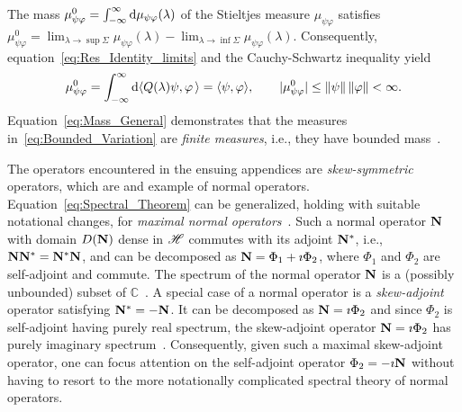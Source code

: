 \documentclass[amsa]{ipart}
\begin{document}
The mass $\mu^0_{\psi\varphi}=\int_{-\infty}^\infty\mathrm{d}\mu_{\psi\varphi}(\lambda)$ of the
Stieltjes measure $\mu_{\psi\varphi}$ satisfies~\cite{Stone:64}
$\mu^0_{\psi\varphi}=\lim_{\lambda\to\sup\Sigma}\mu_{\psi\varphi}(\lambda)-\lim_{\lambda\to\inf\Sigma}\mu_{\psi\varphi}(\lambda)$. Consequently,
equation~\eqref{eq:Res_Identity_limits} and the Cauchy-Schwartz
inequality yield
% 
\begin{align}\label{eq:Mass_General}
  \mu^0_{\psi\varphi}=\int_{-\infty}^\infty\d\langle Q(\lambda)\psi,\varphi\,\rangle=\langle\psi,\varphi\rangle,
  \qquad
  |\mu^0_{\psi\varphi}|\leq\|\psi\|\,\|\varphi\|<\infty.
\end{align}
%
Equation~\eqref{eq:Mass_General} demonstrates that the measures
in~\eqref{eq:Bounded_Variation} are \emph{finite measures}, i.e., they
have bounded mass~\cite{Stone:64}.



The operators encountered in the ensuing appendices are
\emph{skew-symmetric} operators, which are and example of normal
operators. 
Equation~\eqref{eq:Spectral_Theorem} can be generalized, holding with
suitable notational changes, for \emph{maximal normal
  operators}~\cite{Stone:64}. Such a normal operator $\mathbf{N}$ with domain
$D(\mathbf{N})$ dense in $\mathscr{H}$ commutes with its adjoint $\mathbf{N}^*$, i.e., 
$\mathbf{N}\mathbf{N}^*=\mathbf{N}^*\mathbf{N}$, and can be decomposed as $\mathbf{N}=\Phi_1+\imath\Phi_2$, where
$\Phi_1$ and $\Phi_2$ are self-adjoint and commute. The spectrum of the
normal operator $\mathbf{N}$ is 
a (possibly unbounded) subset of $\mathbb{C}$~\cite{Stone:64}. A
special case of a normal operator is a \emph{skew-adjoint} operator
satisfying $\mathbf{N}^*=-\mathbf{N}$. It can be decomposed as $\mathbf{N}=\imath\Phi_2$ and since
$\Phi_2$ is self-adjoint having purely real spectrum, the skew-adjoint
operator $\mathbf{N}=\imath\Phi_2$ has purely imaginary
spectrum~\cite{Stone:64}. Consequently, given such a maximal
skew-adjoint operator, one can focus attention on the self-adjoint
operator $\Phi_2=-\imath\mathbf{N}$ without having to resort to the more notationally
complicated spectral theory of normal operators.
\end{document}
